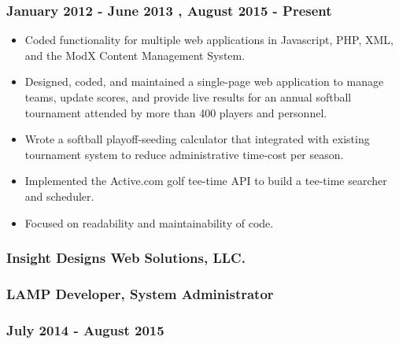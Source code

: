 \hypertarget{january-2012---june-2013-august-2015---present}{%
\subsubsection{January 2012 - June 2013 , August 2015 -
Present}\label{january-2012---june-2013-august-2015---present}}

\begin{itemize}
\tightlist
\item
  Coded functionality for multiple web applications in Javascript, PHP,
  XML, and the ModX Content Management System.
\item
  Designed, coded, and maintained a single-page web application to
  manage teams, update scores, and provide live results for an annual
  softball tournament attended by more than 400 players and personnel.
\item
  Wrote a softball playoff-seeding calculator that integrated with
  existing tournament system to reduce administrative time-cost per
  season.
\item
  Implemented the Active.com golf tee-time API to build a tee-time
  searcher and scheduler.
\item
  Focused on readability and maintainability of code.
\end{itemize}

\hypertarget{insight-designs-web-solutions-llc.}{%
\subsubsection{Insight Designs Web Solutions,
LLC.}\label{insight-designs-web-solutions-llc.}}

\hypertarget{lamp-developer-system-administrator}{%
\subsubsection{LAMP Developer, System
Administrator}\label{lamp-developer-system-administrator}}

\hypertarget{july-2014---august-2015}{%
\subsubsection{July 2014 - August 2015}\label{july-2014---august-2015}}

